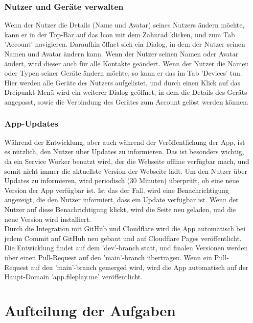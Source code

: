 \documentclass[a4paper]{article}
\begin{document}
\subsubsection{Nutzer und Geräte verwalten}

Wenn der Nutzer die Details (Name und Avatar) seines Nutzers ändern möchte, kann
er in der Top-Bar auf das Icon mit dem Zahnrad klicken, und zum Tab 'Account'
navigieren. Daraufhin öffnet sich ein Dialog, in dem der Nutzer seinen Namen und
Avatar ändern kann. Wenn der Nutzer seinen Namen oder Avatar ändert, wird dieser
auch für alle Kontakte geändert. Wenn der Nutzer die Namen oder Typen seiner
Geräte ändern möchte, so kann er das im Tab 'Devices' tun. Hier werden alle
Geräte des Nutzers aufgelistet, und durch einen Klick auf das Dreipunkt-Menü wird
ein weiterer Dialog geöffnet, in dem die Details des Geräts angepasst,
sowie die Verbindung des Gerätes zum Account gelöst werden können.

\subsubsection{App-Updates}

Während der Entwicklung, aber auch während der Veröffentlichung der App, ist es nützlich,
den Nutzer über Updates zu informieren. Das ist besonders wichtig, da ein
Service Worker benutzt wird, der die Webseite offline verfügbar mach, und somit
nicht immer die aktuellste Version der Webseite lädt. Um den Nutzer über Updates
zu informieren, wird periodisch (30 Minuten) überprüft, ob eine neue Version der
App verfügbar ist. Ist das der Fall, wird eine Benachrichtigung angezeigt, die
den Nutzer informiert, dass ein Update verfügbar ist. Wenn der Nutzer auf diese
Benachrichtigung klickt, wird die Seite neu geladen, und die neue Version wird
installiert.\\
Durch die Integration mit GitHub und Cloudflare wird die App automatisch bei
jedem Commit auf GitHub neu gebaut und auf Cloudflare Pages veröffentlicht. Die
Entwicklung findet auf dem 'dev'-branch statt, und finalen Versionen werden über
einen Pull-Request auf den 'main'-branch übertragen. Wenn ein Pull-Request auf
den 'main'-branch gemerged wird, wird die App automatisch auf der Haupt-Domain
'app.fileplay.me' veröffentlicht.


\section{Aufteilung der Aufgaben}
\end{document}
